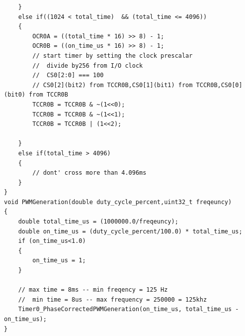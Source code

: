 \documentclass{article}
\begin{document}
\begin{verbatim}
	}
	else if((1024 < total_time)  && (total_time <= 4096))
	{
		OCR0A = ((total_time * 16) >> 8) - 1;
		OCR0B = ((on_time_us * 16) >> 8) - 1;
		// start timer by setting the clock prescalar
		//  divide by256 from I/O clock
		//  CS0[2:0] === 100
		// CS0[2](bit2) from TCCR0B,CS0[1](bit1) from TCCR0B,CS0[0](bit0) from TCCR0B
		TCCR0B = TCCR0B & ~(1<<0);
		TCCR0B = TCCR0B & ~(1<<1);
		TCCR0B = TCCR0B | (1<<2);
		
	}
	else if(total_time > 4096)
	{
		// dont' cross more than 4.096ms
	}
}
void PWMGeneration(double duty_cycle_percent,uint32_t freqeuncy)
{
	double total_time_us = (1000000.0/freqeuncy);	
	double on_time_us = (duty_cycle_percent/100.0) * total_time_us;
	if (on_time_us<1.0)
	{
		on_time_us = 1;
	}
	
	// max time = 8ms -- min freqency = 125 Hz
	//  min time = 8us -- max frequency = 250000 = 125khz
	Timer0_PhaseCorrectedPWMGeneration(on_time_us, total_time_us - on_time_us);
}
\end{verbatim}
\end{document}
